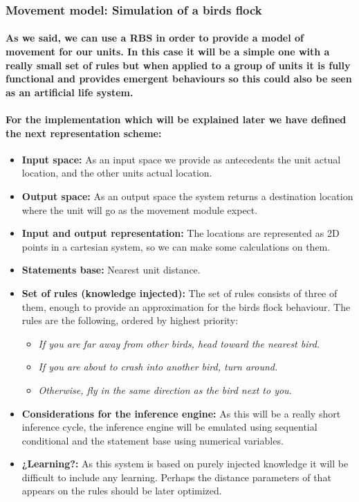 \documentclass[a4paper,10pt]{article}
\newcommand{\p}[1]{\paragraph{\indent\textnormal{#1}}}
\begin{document}
    \subsubsection{Movement model: Simulation of a birds flock}

      \p{As we said, we can use a RBS in order to provide a model of movement for our units. In this case it will be a simple one with a really small set of rules but when applied to a group of units it is fully functional and provides emergent behaviours so this could also be seen as an \textbf{artificial life} system.}

      \p{For the implementation which will be explained later we have defined the next representation scheme:}

      \begin{itemize}
      \item \textbf{Input space:} As an input space we provide as antecedents the unit actual location, and the other units actual location.
      \item \textbf{Output space:} As an output space the system returns a destination location where the unit will go as the movement module expect.
      \item \textbf{Input and output representation:} The locations are represented as 2D points in a cartesian system, so we can make some calculations on them.
      \item \textbf{Statements base:} Nearest unit distance.
      \item \textbf{Set of rules (knowledge injected):} The set of rules consists of three of them, enough to provide an approximation for the birds flock behaviour. The rules are the following, ordered by highest priority:
	  \begin{itemize}
	    \item \textit{If you are far away from other birds, head toward the nearest bird.}
	    \item \textit{If you are about to crash into another bird, turn around.}
	    \item \textit{Otherwise, fly in the same direction as the bird next to you.}

	  \end{itemize}
      \item \textbf{Considerations for the inference engine:} As this will be a really short inference cycle, the inference engine will be emulated using sequential conditional and the statement base using numerical variables.
      \item \textbf{¿Learning?:} As this system is based on purely injected knowledge it will be difficult to include any learning. Perhaps the distance parameters of that appears on the rules should be later optimized.
      \end{itemize}
\end{document}
